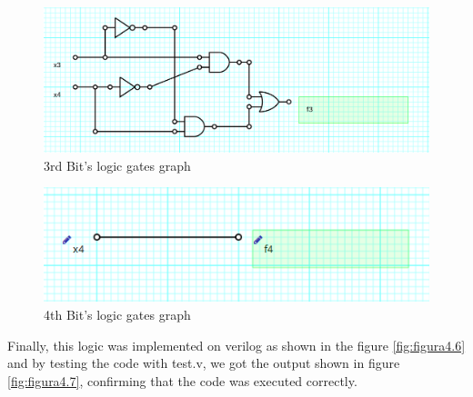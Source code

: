 \begin{figure}[h!] %
\begin{centering}
\includegraphics[scale=0.25]{../E4TP1/images/3}
\par\end{centering}
\caption{\color{cyan}3rd Bit's logic gates graph}
\label{fig:figura4.4}
\end{figure}

\begin{figure}[h!]%
\begin{centering}
\includegraphics[scale=0.25]{../E4TP1/images/4}
\par\end{centering}
\caption{\color{cyan}4th Bit's logic gates graph}
\label{fig:figura4.5}
\end{figure}

Finally, this logic was implemented on verilog as shown in the figure \ref{fig:figura4.6} and by testing the code
with test.v, we got the output shown in figure \ref{fig:figura4.7}, confirming that the code was executed
correctly.

